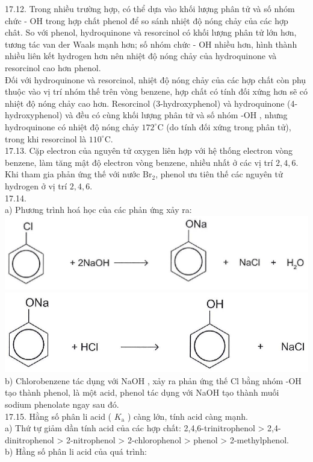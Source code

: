 \documentclass[10pt]{article}
\begin{document}
17.12. Trong nhiều trường hợp, có thể dựa vào khối lượng phân tử và số nhóm chức - OH trong hợp chất phenol để so sánh nhiệt độ nóng chảy của các hợp chât. So với phenol, hydroquinone và resorcinol có khối lượng phân tử lớn hơn, tương tác van der Waals mạnh hơn; số nhóm chức - OH nhiều hơn, hình thành nhiều liên kết hydrogen hơn nên nhiệt độ nóng chảy của hydroquinone và resorcinol cao hơn phenol.\\
Đối với hydroquinone và resorcinol, nhiệt độ nóng chảy của các hợp chất còn phụ thuộc vào vị trí nhóm thế trên vòng benzene, hợp chất có tính đối xứng hơn sẽ có nhiệt độ nóng chảy cao hơn. Resorcinol (3-hydroxyphenol) và hydroquinone (4-hydroxyphenol) và đều có cùng khối lượng phân tử và số nhóm -OH , nhưng hydroquinone có nhiệt độ nóng chảy $172^{\circ} \mathrm{C}$ (do tính đối xứng trong phân tử), trong khi resorcinol là $110^{\circ} \mathrm{C}$.\\
17.13. Cặp electron của nguyên tử oxygen liên hợp với hệ thống electron vòng benzene, làm tăng mật độ electron vòng benzene, nhiều nhất ở các vị trí $2,4,6$. Khi tham gia phản ứng thế với nước $\mathrm{Br}_{2}$, phenol ưu tiên thế các nguyên tử hydrogen ở vị trí $2,4,6$.\\
17.14.\\
a) Phương trình hoá học của các phản ứng xảy ra:\\
\includegraphics[max width=\textwidth, center]{2025_10_23_adad5b98d65ac6665838g-35(3)}\\
\includegraphics[max width=\textwidth, center]{2025_10_23_adad5b98d65ac6665838g-35}\\
b) Chlorobenzene tác dụng với NaOH , xảy ra phản ứng thế Cl bằng nhóm -OH tạo thành phenol, là một acid, phenol tác dụng với NaOH tạo thành muối sodium phenolate ngay sau đó.\\
17.15. Hằng số phân li acid ( $K_{\mathrm{a}}$ ) càng lớn, tính acid càng mạnh.\\
a) Thứ tự giảm dần tính acid của các hợp chất: 2,4,6-trinitrophenol > 2,4-dinitrophenol > 2-nitrophenol > 2-chlorophenol > phenol > 2-methylphenol.\\
b) Hằng số phân li acid của quá trình:
\end{document}
